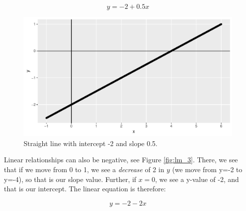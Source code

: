 \documentclass[]{book}\usepackage[]{graphicx}\usepackage[]{color}
\makeatletter
\def\maxwidth{ %
  \ifdim\Gin@nat@width>\linewidth
    \linewidth
  \else
    \Gin@nat@width
  \fi
}
\newenvironment{knitrout}{}{} %
\makeatother
\begin{document}
\begin{equation}
y = -2 + 0.5 x
\end{equation}



\begin{knitrout}
\color{fgcolor}\begin{figure}

{\centering \includegraphics[width=\maxwidth]{figure/lm_2-1} 

}

\caption[Straight line with intercept -2 and slope 0.5]{Straight line with intercept -2 and slope 0.5.}\label{fig:lm_2}
\end{figure}


\end{knitrout}


Linear relationships can also be negative, see Figure \ref{fig:lm_3}. There, we see that if we move from 0 to 1, we see a \textit{decrease} of 2 in $y$ (we move from y=-2 to y=-4), so that is our slope value. Further, if $x=0$, we see a y-value of -2, and that is our intercept. The linear equation is therefore:

\begin{equation}
y = -2 - 2 x
\end{equation}
\end{document}
